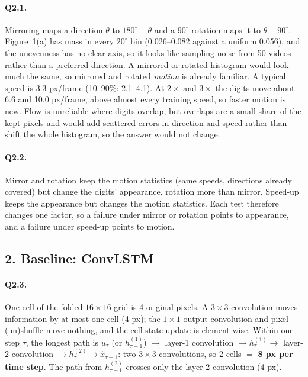 \paragraph{Q2.1.} Mirroring maps a direction $\theta$ to $180^\circ-\theta$ and a $90^\circ$ rotation maps it to $\theta+90^\circ$. Figure~1(a) has mass in every $20^\circ$ bin (0.026--0.082 against a uniform 0.056), and the unevenness has no clear axis, so it looks like sampling noise from 50 videos rather than a preferred direction. A mirrored or rotated histogram would look much the same, so mirrored and rotated \emph{motion} is already familiar. A typical speed is 3.3 px/frame (10--90\%: 2.1--4.1). At $2\times$ and $3\times$ the digits move about 6.6 and 10.0 px/frame, above almost every training speed, so faster motion is new. Flow is unreliable where digits overlap, but overlaps are a small share of the kept pixels and would add scattered errors in direction and speed rather than shift the whole histogram, so the answer would not change.

\paragraph{Q2.2.} Mirror and rotation keep the motion statistics (same speeds, directions already covered) but change the digits' appearance, rotation more than mirror. Speed-up keeps the appearance but changes the motion statistics. Each test therefore changes one factor, so a failure under mirror or rotation points to appearance, and a failure under speed-up points to motion.

\subsection*{2. Baseline: ConvLSTM}

\paragraph{Q2.3.} One cell of the folded $16\times16$ grid is 4 original pixels. A $3\times3$ convolution moves information by at most one cell (4 px); the $1\times1$ output convolution and pixel (un)shuffle move nothing, and the cell-state update is element-wise. Within one step $\tau$, the longest path is $u_\tau$ (or $h^{(1)}_{\tau-1}$) $\to$ layer-1 convolution $\to h^{(1)}_\tau \to$ layer-2 convolution $\to h^{(2)}_\tau \to \hat x_{\tau+1}$: two $3\times3$ convolutions, so 2 cells $=$ \textbf{8 px per time step}. The path from $h^{(2)}_{\tau-1}$ crosses only the layer-2 convolution (4 px).

